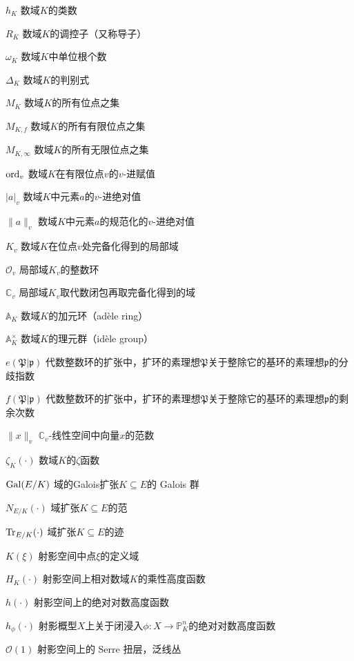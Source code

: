 \begin{denotation}[3cm]
\item[$h_K$] 数域$K$的类数
\item[$R_K$] 数域$K$的调控子（又称导子）
\item[$\omega_K$] 数域$K$中单位根个数
\item[$\Delta_K$] 数域$K$的判别式
\item[$M_K$] 数域$K$的所有位点之集
\item[$M_{K,f}$] 数域$K$的所有有限位点之集
\item[$M_{K,\infty}$] 数域$K$的所有无限位点之集
\item[$\operatorname{ord}_v$] 数域$K$在有限位点$v$的$v$-进赋值
\item[$|a|_v$] 数域$K$中元素$a$的$v$-进绝对值
\item[$\|a\|_v$] 数域$K$中元素$a$的规范化的$v$-进绝对值
\item[$K_v$] 数域$K$在位点$v$处完备化得到的局部域
\item[$\mathcal{O}_{v}$] 局部域$K_v$的整数环
\item[$\mathbb{C}_v$] 局部域$K_v$取代数闭包再取完备化得到的域
\item[$\mathbb{A}_K$] 数域$K$的加元环（ad\`{e}le ring）
\item[$\mathbb{A}_K^\times$] 数域$K$的理元群（id\`{e}le group）
\item[$e(\mathfrak{P}|\mathfrak{p})$] 代数整数环的扩张中，扩环的素理想$\mathfrak{P}$关于整除它的基环的素理想$\mathfrak{p}$的分歧指数
\item[$f(\mathfrak{P}|\mathfrak{p})$] 代数整数环的扩张中，扩环的素理想$\mathfrak{P}$关于整除它的基环的素理想$\mathfrak{p}$的剩余次数
\item[$\|x\|_v$] $\mathbb{C}_v$-线性空间中向量$x$的范数
\item[$\zeta_K(\cdot)$] 数域$K$的$\zeta$函数
\item[$\operatorname{Gal}(E/K)$] 域的Galois扩张$K\subseteq E$的 Galois 群
\item[$N_{E/K}(\cdot)$] 域扩张$K\subseteq E$的范
\item[$\operatorname{Tr}_{E/K}(\cdot)$] 域扩张$K\subseteq E$的迹
\item[$K(\xi)$] 射影空间中点$\xi$的定义域
\item[$H_K(\cdot)$] 射影空间上相对数域$K$的乘性高度函数
\item[$h(\cdot)$] 射影空间上的绝对对数高度函数
\item[$h_{\phi}(\cdot)$] 射影概型$X$上关于闭浸入$\phi: X \to \mathbb{P}_K^n$的绝对对数高度函数
\item[$\mathcal{O}(1)$] 射影空间上的 Serre 扭层，泛线丛

\end{denotation}
